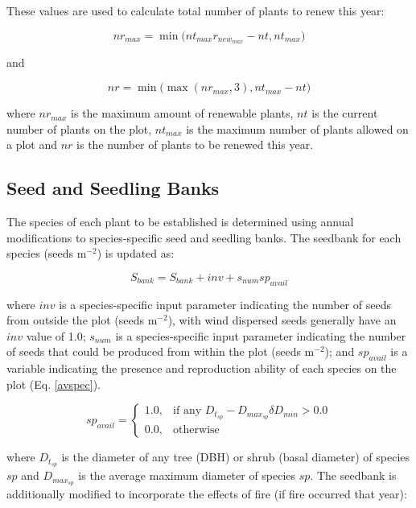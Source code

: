 \documentclass[a4paper, 12pt] {report}
\begin{document}
These values are used to calculate total number of plants to renew this year:

\begin{equation} 
nr_{max} = \min\Big(nt_{max}r_{new_{max}} - nt, nt_{max}\Big)
\end{equation}

and

\begin{equation}  \label{newtrees}
nr = \min\Big(\max(nr_{max}, 3), nt_{max} - nt\Big)
\end{equation}

where $nr_{max}$ is the maximum amount of renewable plants, $nt$ is the current number of plants on the plot, $nt_{max}$ is the maximum number of plants allowed on a plot and $nr$ is the number of plants to be renewed this year.

\subsection{Seed and Seedling Banks} \label{seeds}

The species of each plant to be established is determined using annual modifications to species-specific seed and seedling banks. The seedbank for each species (seeds m$^{-2}$) is updated as:

\begin{equation} \label{Sbank}
S_{bank} = S_{bank} + inv + s_{num}sp_{avail}
\end{equation}

where $inv$ is a species-specific input parameter indicating the number of seeds from outside the plot (seeds m$^{-2}$), with wind dispersed seeds generally have an $inv$ value of 1.0; $s_{num}$ is a species-specific input parameter indicating the number of seeds that could be produced from within the plot (seeds m$^{-2}$); and $sp_{avail}$ is a variable indicating the presence and reproduction ability of each species on the plot (Eq. \ref{avspec}).

\begin{equation} \label{avspec}
sp_{avail} = \begin{cases}
1.0, & \text{if any $D_{t_{sp}} - D_{max_{sp}}\delta D_{min} > 0.0$} \\
0.0, & \text{otherwise}
\end{cases}
\end{equation}

where $D_{t_{sp}}$ is the diameter of any tree (DBH) or shrub (basal diameter) of species $sp$ and $D_{max_{sp}}$ is the average maximum diameter of species $sp$. The seedbank is additionally modified to incorporate the effects of fire (if fire occurred that year):
\end{document}
